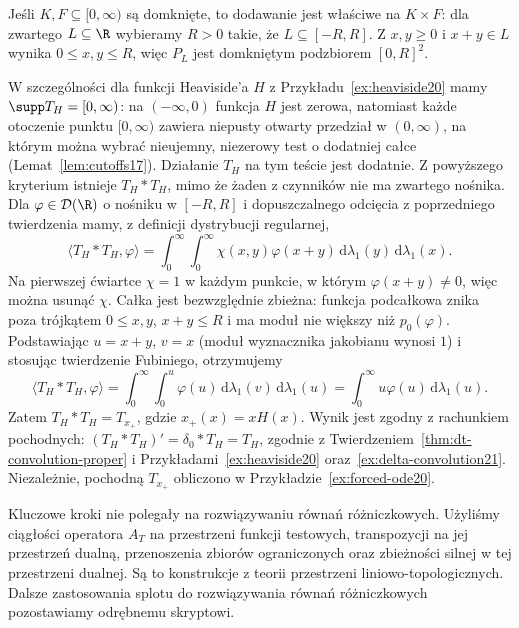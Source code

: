 \begin{przyklad}
\label{ex:dt-convolution-halfline}
Jeśli $K,F\subseteq[0,\infty)$ są domknięte,
to dodawanie jest właściwe na $K\times F$:
dla zwartego $L\subseteq\R$ wybieramy $R>0$ takie,
że $L\subseteq[-R,R]$. Z $x,y\ge0$ i $x+y\in L$
wynika $0\le x,y\le R$, więc $P_L$ jest domkniętym
podzbiorem $[0,R]^2$.

W szczególności dla funkcji Heaviside'a $H$
z Przykładu~\ref{ex:heaviside20} mamy
$\supp T_H=[0,\infty)$: na $(-\infty,0)$ funkcja
$H$ jest zerowa, natomiast każde otoczenie punktu
$[0,\infty)$ zawiera niepusty otwarty przedział
w $(0,\infty)$, na którym można wybrać nieujemny,
niezerowy test o dodatniej całce
(Lemat~\ref{lem:cutoffs17}).
Działanie $T_H$ na tym teście jest dodatnie.
Z powyższego kryterium istnieje $T_H*T_H$,
mimo że żaden z czynników nie ma zwartego nośnika.
Dla $\varphi\in\mathcal D(\R)$ o nośniku w $[-R,R]$
i dopuszczalnego odcięcia z poprzedniego twierdzenia
mamy, z definicji dystrybucji regularnej,
\[
 \langle T_H*T_H,\varphi\rangle
 =\int_0^\infty\int_0^\infty
 \chi(x,y)\varphi(x+y)\,\mathrm d\lambda_1(y)\,
 \mathrm d\lambda_1(x).
\]
Na pierwszej ćwiartce $\chi=1$ w każdym punkcie,
w którym $\varphi(x+y)\ne0$, więc można usunąć $\chi$.
Całka jest bezwzględnie zbieżna: funkcja podcałkowa
znika poza trójkątem $0\le x,y$, $x+y\le R$
i ma moduł nie większy niż $p_0(\varphi)$.
Podstawiając $u=x+y$, $v=x$ (moduł wyznacznika
jakobianu wynosi $1$) i stosując twierdzenie Fubiniego,
otrzymujemy
\[
 \langle T_H*T_H,\varphi\rangle
 =\int_0^\infty\int_0^u\varphi(u)\,
 \mathrm d\lambda_1(v)\,\mathrm d\lambda_1(u)
 =\int_0^\infty u\varphi(u)\,\mathrm d\lambda_1(u).
\]
Zatem $T_H*T_H=T_{x_+}$, gdzie $x_+(x)=xH(x)$.
Wynik jest zgodny z rachunkiem pochodnych:
$(T_H*T_H)'=\delta_0*T_H=T_H$, zgodnie z
Twierdzeniem~\ref{thm:dt-convolution-proper}
i Przykładami~\ref{ex:heaviside20}
oraz~\ref{ex:delta-convolution21}.
Niezależnie, pochodną $T_{x_+}$ obliczono
w Przykładzie~\ref{ex:forced-ode20}.
\end{przyklad}

\begin{uwaga}
\label{rem:convolution-tvs21}
Kluczowe kroki nie polegały na rozwiązywaniu równań
różniczkowych. Użyliśmy ciągłości operatora
$A_T$ na przestrzeni funkcji testowych, transpozycji
na jej przestrzeń dualną, przenoszenia zbiorów ograniczonych
oraz zbieżności silnej w tej przestrzeni dualnej.
Są to konstrukcje z teorii przestrzeni liniowo-topologicznych.
Dalsze zastosowania splotu do rozwiązywania równań
różniczkowych pozostawiamy odrębnemu skryptowi.
\end{uwaga}

